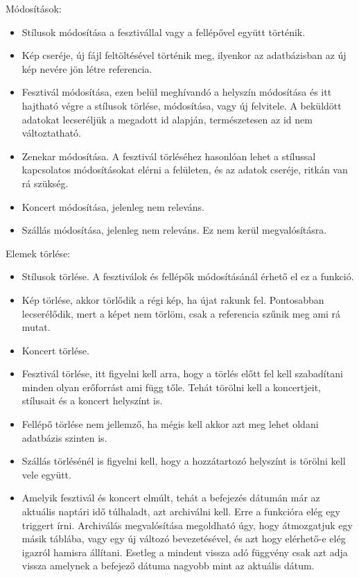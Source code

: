 Módosítások:
\begin{itemize}

\item Stílusok módosítása a fesztivállal vagy a fellépővel együtt történik.

\item Kép cseréje, új fájl feltöltésével történik meg, ilyenkor az adatbázisban az új kép nevére jön létre referencia.

\item Fesztivál módosítása, ezen belül meghívandó a helyszín módosítása és itt hajtható végre a stílusok törlése, módosítása, vagy új felvitele. A beküldött adatokat lecseréljük a megadott id alapján, természetesen az id nem változtatható.

\item Zenekar módosítása. A fesztivál törléséhez hasonlóan lehet a stílussal  kapcsolatos módosításokat elérni a felületen, és az adatok cseréje, ritkán van rá szükség.

\item Koncert módosítása, jelenleg nem releváns. 
\item Szállás módosítása, jelenleg nem releváns. Ez nem kerül megvalósításra.
\end{itemize}

 Elemek törlése:
\begin{itemize}
\item Stílusok törlése. A fesztiválok és fellépők módosításánál érhető el ez a funkció.

\item Kép törlése, akkor törlődik a régi kép, ha újat rakunk fel. Pontosabban lecserélődik, mert a képet nem törlöm, csak a referencia szűnik meg ami rá mutat.
\item Koncert törlése.
\item Fesztivál törlése, itt figyelni kell arra, hogy a törlés előtt fel kell szabadítani minden olyan erőforrást ami függ tőle. Tehát törölni kell a koncertjeit, stílusait és a koncert helyszínt is.
\item Fellépő törlése nem jellemző, ha mégis kell akkor azt meg lehet oldani adatbázis szinten is.
\item Szállás törlésénél is figyelni kell, hogy a hozzátartozó helyszínt is törölni kell vele együtt.
\item Amelyik fesztivál és koncert elmúlt, tehát a befejezés dátumán már az aktuális naptári idő  túlhaladt, azt archiválni kell. Erre a funkcióra elég egy triggert írni. Archiválás megvalósítása megoldható úgy, hogy átmozgatjuk egy másik táblába, vagy egy új változó bevezetésével, és azt hogy elérhető-e elég igazról hamisra állítani. Esetleg a mindent vissza adó függvény csak azt adja vissza amelynek a befejező dátuma nagyobb mint az aktuális dátum.
\end{itemize}

